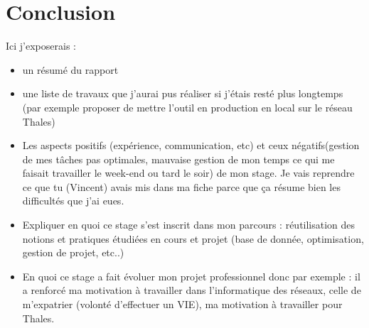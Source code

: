 \chapter*{Conclusion}



Ici j'exposerais :
\begin{itemize}
\item un résumé du rapport
\item une liste de travaux que j'aurai pus réaliser si j'étais resté plus longtemps (par exemple proposer de mettre l'outil en production en local sur le réseau Thales)
\item Les aspects positifs (expérience, communication, etc) et ceux négatifs(gestion de mes tâches pas optimales, mauvaise gestion de mon temps ce qui me faisait travailler le week-end ou tard le soir) de mon stage. Je vais reprendre ce que tu (Vincent) avais mis dans ma fiche parce que ça résume bien les difficultés que j'ai eues.
\item Expliquer en quoi ce stage s'est inscrit dans mon parcours : réutilisation des notions et pratiques étudiées en cours et projet (base de donnée, optimisation, gestion de projet, etc..)
\item En quoi ce stage a fait évoluer mon projet professionnel donc par exemple : il a renforcé ma motivation à travailler dans l'informatique des réseaux, celle de m'expatrier (volonté d'effectuer un VIE), ma motivation à travailler pour Thales.
\end{itemize}
